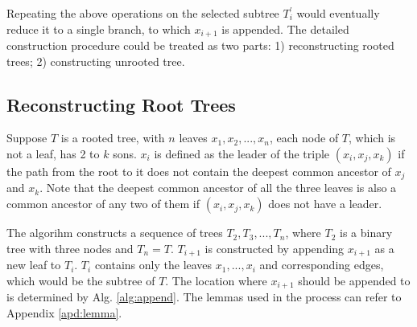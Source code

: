 \documentclass[12pt,a4paper]{article}
\theoremstyle{definition}
\begin{document}
\vspace{0.008\linewidth}
Repeating the above operations on the selected subtree $T_i^{'}$ would eventually reduce it to a single branch, to which $x_{i+1}$ is appended. The detailed construction procedure could be treated as two parts: 1) reconstructing rooted trees; 2) constructing unrooted tree.

\subsection{Reconstructing Root Trees}

Suppose $T$ is a rooted tree, with $n$ leaves $x_1, x_2, ... , x_n$, each node of $T$, which is not a leaf, has 2 to $k$ sons. $x_i$ is defined as the leader of the triple $(x_i, x_j, x_k)$ if the path from the root to it does not contain the deepest common ancestor of $x_j$ and $x_k$. Note that the deepest common ancestor of all the three leaves is also a common ancestor of any two of them if $(x_i, x_j, x_k)$ does not have a leader.

\vspace{0.008\linewidth}
The algorihm constructs a sequence of trees $T_2, T_3, ... , T_n$, where $T_2$ is a binary tree with three nodes and $T_n=T$. $T_{i+1}$ is constructed by appending $x_{i+1}$ as a new leaf to $T_i$. $T_i$ contains only the leaves $x_1, ... , x_i$ and corresponding edges, which would be the subtree of $T$. The location where $x_{i+1}$ should be appended to is determined by Alg. \ref{alg:append}. The lemmas used in the process can refer to Appendix \ref{apd:lemma}.
\end{document}
